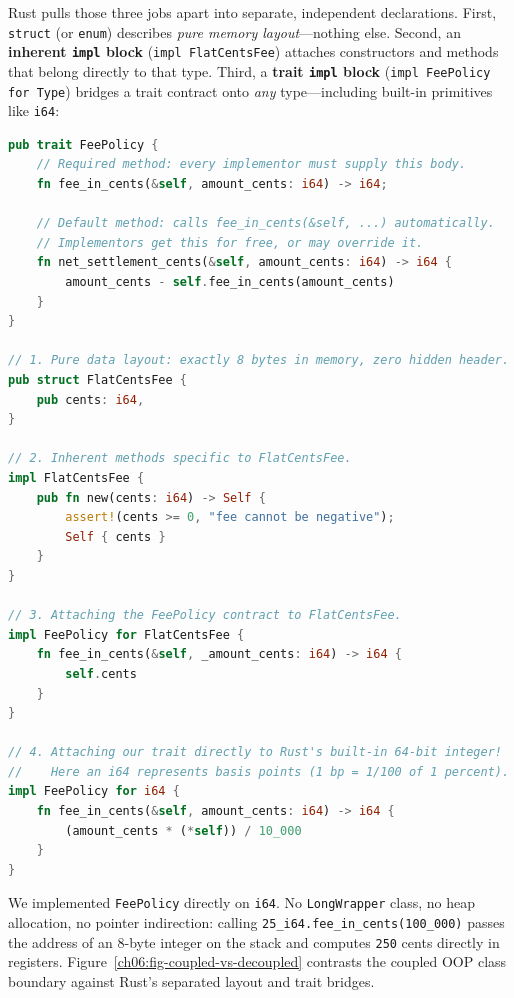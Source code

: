 Rust pulls those three jobs apart into separate, independent declarations. First, \texttt{struct} (or \texttt{enum}) describes \emph{pure memory layout}---nothing else. Second, an \textbf{inherent \texttt{impl} block} (\texttt{impl FlatCentsFee}) attaches constructors and methods that belong directly to that type. Third, a \textbf{trait \texttt{impl} block} (\texttt{impl FeePolicy for Type}) bridges a trait contract onto \emph{any} type---including built-in primitives like \texttt{i64}:

\begin{lstlisting}[language=Rust, caption={Rust separates byte layout (struct), inherent methods (impl Type), and polymorphic contracts (impl Trait for Type).}]
pub trait FeePolicy {
    // Required method: every implementor must supply this body.
    fn fee_in_cents(&self, amount_cents: i64) -> i64;

    // Default method: calls fee_in_cents(&self, ...) automatically.
    // Implementors get this for free, or may override it.
    fn net_settlement_cents(&self, amount_cents: i64) -> i64 {
        amount_cents - self.fee_in_cents(amount_cents)
    }
}

// 1. Pure data layout: exactly 8 bytes in memory, zero hidden header.
pub struct FlatCentsFee {
    pub cents: i64,
}

// 2. Inherent methods specific to FlatCentsFee.
impl FlatCentsFee {
    pub fn new(cents: i64) -> Self {
        assert!(cents >= 0, "fee cannot be negative");
        Self { cents }
    }
}

// 3. Attaching the FeePolicy contract to FlatCentsFee.
impl FeePolicy for FlatCentsFee {
    fn fee_in_cents(&self, _amount_cents: i64) -> i64 {
        self.cents
    }
}

// 4. Attaching our trait directly to Rust's built-in 64-bit integer!
//    Here an i64 represents basis points (1 bp = 1/100 of 1 percent).
impl FeePolicy for i64 {
    fn fee_in_cents(&self, amount_cents: i64) -> i64 {
        (amount_cents * (*self)) / 10_000
    }
}
\end{lstlisting}

We implemented \texttt{FeePolicy} directly on \texttt{i64}. No \texttt{LongWrapper} class, no heap allocation, no pointer indirection: calling \texttt{25\_i64.fee\_in\_cents(100\_000)} passes the address of an 8-byte integer on the stack and computes \texttt{250} cents directly in registers. Figure~\ref{ch06:fig-coupled-vs-decoupled} contrasts the coupled OOP class boundary against Rust's separated layout and trait bridges.

